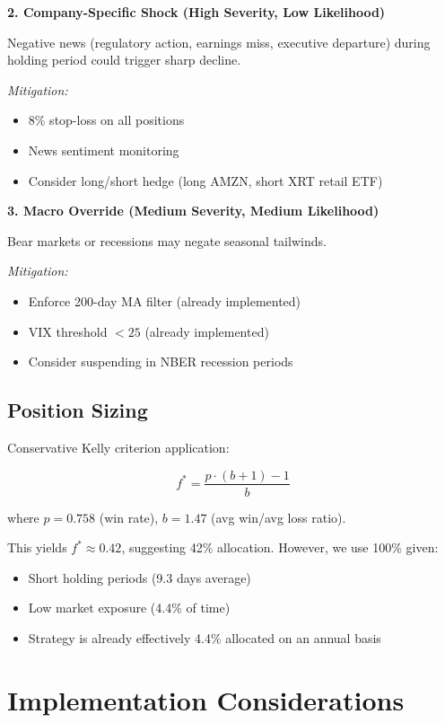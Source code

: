 \documentclass[twocolumn,ieee]{arithmaxresearch}
\begin{document}
\textbf{2. Company-Specific Shock (High Severity, Low Likelihood)}

Negative news (regulatory action, earnings miss, executive departure) during holding period could trigger sharp decline.

\textit{Mitigation:}
\begin{itemize}
    \item 8\% stop-loss on all positions
    \item News sentiment monitoring
    \item Consider long/short hedge (long AMZN, short XRT retail ETF)
\end{itemize}

\textbf{3. Macro Override (Medium Severity, Medium Likelihood)}

Bear markets or recessions may negate seasonal tailwinds.

\textit{Mitigation:}
\begin{itemize}
    \item Enforce 200-day MA filter (already implemented)
    \item VIX threshold $< 25$ (already implemented)
    \item Consider suspending in NBER recession periods
\end{itemize}

\subsection{Position Sizing}

Conservative Kelly criterion application:

\begin{equation}
f^* = \frac{p \cdot (b+1) - 1}{b}
\end{equation}

where $p = 0.758$ (win rate), $b = 1.47$ (avg win/avg loss ratio).

This yields $f^* \approx 0.42$, suggesting 42\% allocation. However, we use 100\% given:
\begin{itemize}
    \item Short holding periods (9.3 days average)
    \item Low market exposure (4.4\% of time)
    \item Strategy is already effectively 4.4\% allocated on an annual basis
\end{itemize}

\section{Implementation Considerations}
\end{document}
